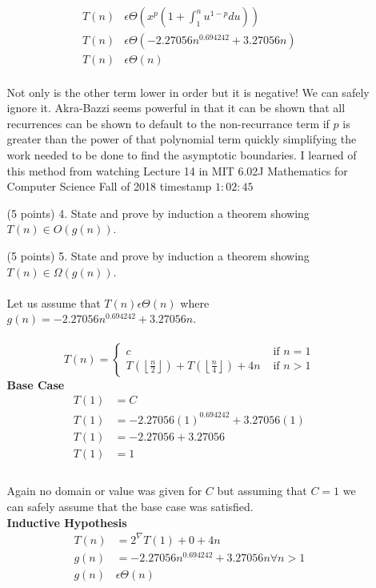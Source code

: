 \documentclass[paper=a4,fontsize=11pt]{article}
\begin{document}
\begin{enumerate}
\begin{enumerate}
\begin{align*}
T(n) &\epsilon \Theta(x^p(1+\int_{1}^{n}{u^{1-p}du}))\\
T(n) &\epsilon \Theta(-2.27056n^{0.694242}+3.27056n)\\
T(n) &\epsilon \Theta(n)
\end{align*}\\
Not only is the other term lower in order but it is negative! We can safely ignore it. Akra-Bazzi seems powerful in that it can be shown that all recurrences can be shown to default to the non-recurrance term if $p$ is greater than the power of that polynomial term quickly simplifying the work needed to be done to find the asymptotic boundaries. I learned of this method from watching Lecture 14 in MIT 6.02J Mathematics for Computer Science Fall of 2018 timestamp $1:02:45$\\
\item [(5 points) 4.] State and prove by induction a theorem showing $T (n) \in O(g(n))$.
\item [(5 points) 5.] State and prove by induction a theorem showing $T (n) \in \Omega(g(n))$.\\\\
Let us assume that $T(n) \epsilon \Theta(n)$ where $g(n)=-2.27056n^{0.694242}+3.27056n$.\\\\
\[
T(n) = \left\{
\begin{array}{cl}
c & \textrm{ if } n = 1\\
T(\left\lfloor\frac{n}{2}\right\rfloor) + T(\left\lfloor\frac{n}{4}\right\rfloor) + 4n & \textrm{ if } n > 1
\end{array}
\right.
\]
\textbf{Base Case}\\
\begin{align*}
T(1) &= C\\
T(1) &= -2.27056(1)^{0.694242}+3.27056(1)\\
T(1) &= -2.27056+3.27056\\
T(1) &= 1\\
\end{align*}\\
Again no domain or value was given for $C$ but assuming that $C=1$ we can safely assume that the base case was satisfied.\\
\textbf{Inductive Hypothesis}\\
\begin{align*}
T(n) &=2^{\nabla}T(1) + 0 + 4n\\
g(n) &= -2.27056n^{0.694242}+3.27056n\forall{n>1}\\
g(n) &\epsilon \Theta(n)\\

\end{align*}
\end{enumerate}
\end{enumerate}
\end{document}
